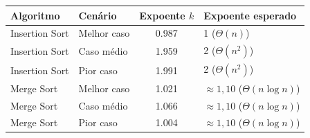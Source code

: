 \begin{tabular}{l l S[table-format=1.3] l}
\toprule
Algoritmo & Cenário & {Expoente $k$} & Expoente esperado \\
\midrule
Insertion Sort & Melhor caso & 0.987 & 1 ($\Theta(n)$) \\
Insertion Sort & Caso médio & 1.959 & 2 ($\Theta(n^2)$) \\
Insertion Sort & Pior caso & 1.991 & 2 ($\Theta(n^2)$) \\
Merge Sort & Melhor caso & 1.021 & $\approx 1{,}10$ ($\Theta(n \log n)$) \\
Merge Sort & Caso médio & 1.066 & $\approx 1{,}10$ ($\Theta(n \log n)$) \\
Merge Sort & Pior caso & 1.004 & $\approx 1{,}10$ ($\Theta(n \log n)$) \\
\bottomrule
\end{tabular}
